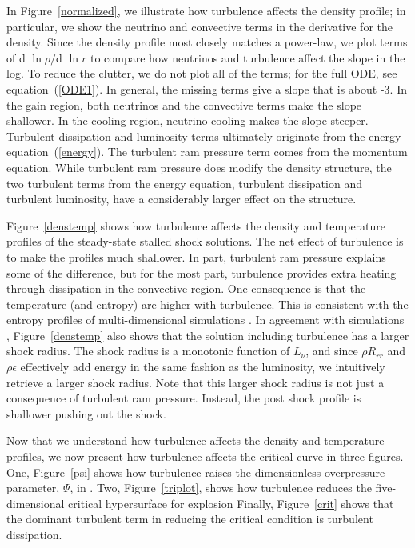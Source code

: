 \documentclass[twocolumn]{aastex6}
\begin{document}
In Figure~\ref{normalized}, we illustrate how
turbulence affects the density profile;
in particular, we show the neutrino and convective terms in
  the derivative for the density.  Since the density profile most
  closely matches a power-law, we plot terms of d $\ln \rho/$d $\ln r$
  to compare how neutrinos and turbulence affect the slope in the
  log.  To reduce the clutter, we do not
  plot all of the terms; for the full ODE, see equation~(\ref{ODE1}).  In
  general, the missing terms give a slope that is about -3.  In the
  gain region, both neutrinos and the convective terms make the slope
  shallower.  In the cooling region, neutrino cooling makes the slope
  steeper. Turbulent dissipation
and luminosity terms ultimately originate from the energy
equation~(\ref{energy}).  The turbulent ram pressure term comes from the
momentum equation. While turbulent
  ram pressure does modify the density structure, the two turbulent terms from
  the energy equation, turbulent dissipation and turbulent luminosity, have a
  considerably larger effect on the structure.


Figure~\ref{denstemp} shows how turbulence affects the
  density and temperature profiles of the steady-state stalled shock
  solutions.  The net
effect of turbulence is to make the profiles much shallower.  In
part, turbulent ram pressure explains some of the difference,
but for the most part, turbulence provides extra heating through
  dissipation in the convective region.  One consequence is that the
  temperature (and entropy) are higher with turbulence.  This is
  consistent with the entropy profiles of multi-dimensional simulations
 \citep{murphy11,murphy13}. In agreement with simulations \citep{murphy13,abdi16}, Figure~\ref{denstemp} also shows that the solution including turbulence has a larger shock radius. The shock radius is a monotonic function of $L_\nu$, and since $\rho R_{rr}$ and
$\rho \epsilon$ effectively add energy in the same fashion as the
luminosity, we intuitively retrieve a larger shock radius.
Note that this larger shock radius is not just a consequence
  of turbulent ram pressure.  Instead, the post shock profile is
  shallower pushing out the shock.

Now that we understand how turbulence affects the density and
temperature profiles, we now present how turbulence affects the
critical curve in three figures. One, Figure~\ref{psi} shows how turbulence raises the dimensionless overpressure parameter, $\Psi$, in
\citet{murphy17}. Two, Figure~\ref{triplot}, shows
  how turbulence reduces the five-dimensional critical hypersurface for explosion
Finally, Figure~\ref{crit} shows that the dominant turbulent
  term in reducing the critical condition is turbulent dissipation. 
\end{document}

